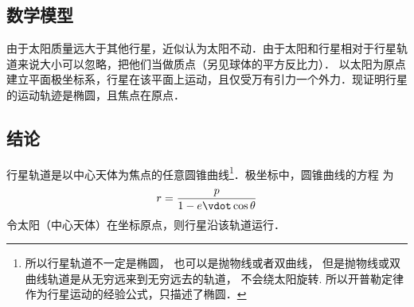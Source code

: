 \subsection{数学模型}
由于太阳质量远大于其他行星，近似认为太阳不动．由于太阳和行星相对于行星轨道来说大小可以忽略，把他们当做质点（另见球体的平方反比力）．%
以太阳为原点建立平面极坐标系，行星在该平面上运动，且仅受万有引力一个外力．现证明行星的运动轨迹是椭圆，且焦点在原点．

\subsection{结论}
行星轨道是以中心天体为焦点的任意圆锥曲线\footnote{所以行星轨道不一定是椭圆， 也可以是抛物线或者双曲线， 但是抛物线或双曲线轨道是从无穷远来到无穷远去的轨道， 不会绕太阳旋转. 所以开普勒定律作为行星运动的经验公式，只描述了椭圆．}．极坐标中，圆锥曲线的方程
为
\begin{equation}\label{Keple1_eq1}
r = \frac{p}{{1 - e \vdot \cos \theta }}
\end{equation}
令太阳（中心天体）在坐标原点，则行星沿该轨道运行．



